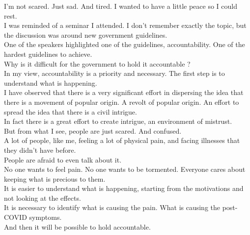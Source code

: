 \documentclass[11pt]{book}
\begin{document}
\noindent I'm not scared. Just sad. And tired. I wanted to have a little peace so I could rest. \\

\noindent I was reminded of a seminar I attended. I don't remember exactly the topic, but the discussion was around new government guidelines. \\

\noindent One of the speakers highlighted one of the guidelines, accountability. One of the hardest guidelines to achieve. \\

\noindent Why is it difficult for the government to hold it accountable ? \\

\noindent In my view, accountability is a priority and necessary. The first step is to understand what is happening. \\

\noindent I have observed that there is a very significant effort in dispersing the idea that there is a movement of popular origin. A revolt of popular origin. An effort to spread the idea that there is a civil intrigue. \\

\noindent In fact there is a great effort to create intrigue, an environment of mistrust. \\

\noindent But from what I see, people are just scared. And confused. \\

\noindent A lot of people, like me, feeling a lot of physical pain, and facing illnesses that they didn't have before. \\

\noindent People are afraid to even talk about it. \\

\noindent No one wants to feel pain. No one wants to be tormented. Everyone cares about keeping what is precious to them. \\

\noindent It is easier to understand what is happening, starting from the motivations and not looking at the effects. \\

\noindent It is necessary to identify what is causing the pain. What is causing the post-COVID symptoms. \\

\noindent And then it will be possible to hold accountable. \\
\end{document}
